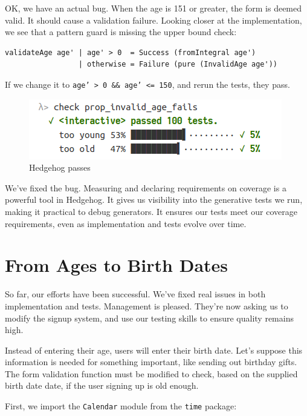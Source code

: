 \noindent OK, we have an actual bug. When the age is 151 or greater, the form is
deemed valid. It should cause a validation failure. Looking closer at
the implementation, we see that a pattern guard is missing the upper
bound check:

\begin{verbatim}
validateAge age' | age' > 0  = Success (fromIntegral age')
                 | otherwise = Failure (pure (InvalidAge age'))
\end{verbatim}
If we change it to
\texttt{age' > 0 && age' <= 150},
and rerun the tests, they pass.

\begin{figure}[htbp]
 \centering
 \includegraphics[width=.95\linewidth]{./pics/hedgehog3.png}
 \caption{Hedgehog passes}
 \label{fig:hedgehog3}
\end{figure}

\noindent We've fixed the bug.
Measuring and declaring requirements on coverage is a powerful tool in
Hedgehog. It gives us visibility into the generative tests we run,
making it practical to debug generators. It ensures our tests meet our
coverage requirements, even as implementation and tests evolve over
time.

\section{From Ages to Birth Dates}\label{from-ages-to-birth-dates}

So far, our efforts have been successful. We've fixed real issues in
both implementation and tests. Management is pleased. They're now asking
us to modify the signup system, and use our testing skills to ensure
quality remains high.

Instead of entering their age, users will enter their birth date. Let's
suppose this information is needed for something important, like sending
out birthday gifts. The form validation function must be modified to
check, based on the supplied birth date date, if the user signing up is
old enough.

First, we import the \texttt{Calendar} module from the \texttt{time}
package:

